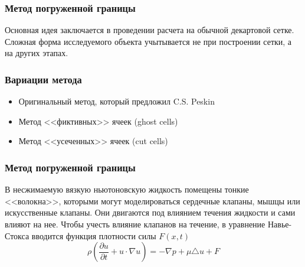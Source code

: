 \documentclass[14pt]{beamer}
\begin{document}
\begin{frame}
\frametitle{Метод погруженной границы}
Основная идея заключается в проведении расчета на обычной декартовой сетке. Сложная форма исследуемого объекта учытывается не при построении сетки, а на других этапах.
\end{frame}

\begin{frame}
\frametitle{Вариации метода}
\begin{itemize}
    \item \alert<+>{Оригинальный метод, который предложил C.S. Peskin}
    \item \alert<+>{Метод <<фиктивных>> ячеек (ghost cells)}
    \item \alert<+>{Метод <<усеченных>> ячеек (cut cells)}
\end{itemize}
\end{frame}

\begin{frame}
\frametitle{Метод погруженной границы}
В несжимаемую вязкую ньютоновскую жидкость помещены тонкие <<волокна>>, которыми могут моделироваться сердечные клапаны, мышцы или искусственные клапаны. Они двигаются под влиянием течения жидкости и сами влияют на нее.
Чтобы учесть влияние клапанов на течение, в уравнение Навье-Стокса вводится функция плотности силы $F(x, t)$
\begin{equation}
    \rho (\frac{\partial u}{\partial t} + u \cdot \nabla u) = - \nabla p + \mu \triangle u + F
\end{equation}
\end{frame}
\end{document}
